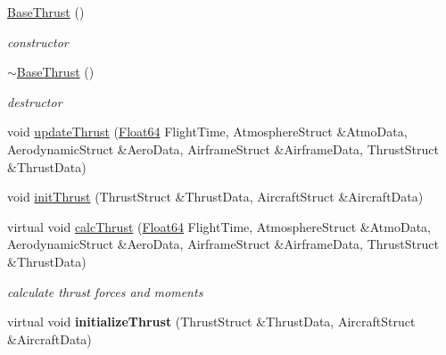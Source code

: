 \begin{DoxyCompactItemize}
\item 
\mbox{\label{group___engine_a19885a6a70bfc4c02e2d8f310af9f22e}} 
\hyperlink{group___engine_a19885a6a70bfc4c02e2d8f310af9f22e}{Base\+Thrust} ()
\begin{DoxyCompactList}\small\item\em constructor \end{DoxyCompactList}\item 
\mbox{\label{group___engine_a554955351c2acfe7a46c00fe056c5c6c}} 
\hyperlink{group___engine_a554955351c2acfe7a46c00fe056c5c6c}{$\sim$\+Base\+Thrust} ()
\begin{DoxyCompactList}\small\item\em destructor \end{DoxyCompactList}\item 
void \hyperlink{group___engine_a869359a1b2b7cddcbe5979d6a1cf5eac}{update\+Thrust} (\hyperlink{group___tools_ga3f1431cb9f76da10f59246d1d743dc2c}{Float64} Flight\+Time, Atmosphere\+Struct \&Atmo\+Data, Aerodynamic\+Struct \&Aero\+Data, Airframe\+Struct \&Airframe\+Data, Thrust\+Struct \&Thrust\+Data)
\item 
void \hyperlink{group___engine_a02b3fe7f763d84c5d34b59f124eaf455}{init\+Thrust} (Thrust\+Struct \&Thrust\+Data, Aircraft\+Struct \&Aircraft\+Data)
\item 
virtual void \hyperlink{group___engine_ac578e683598739655ce52ea85d97362b}{calc\+Thrust} (\hyperlink{group___tools_ga3f1431cb9f76da10f59246d1d743dc2c}{Float64} Flight\+Time, Atmosphere\+Struct \&Atmo\+Data, Aerodynamic\+Struct \&Aero\+Data, Airframe\+Struct \&Airframe\+Data, Thrust\+Struct \&Thrust\+Data)
\begin{DoxyCompactList}\small\item\em calculate thrust forces and moments \end{DoxyCompactList}\item 
\mbox{\label{group___engine_acddab9ce3f3d8a8f55ef61edbcfd5ffd}} 
virtual void {\bfseries initialize\+Thrust} (Thrust\+Struct \&Thrust\+Data, Aircraft\+Struct \&Aircraft\+Data)
\end{DoxyCompactItemize}


